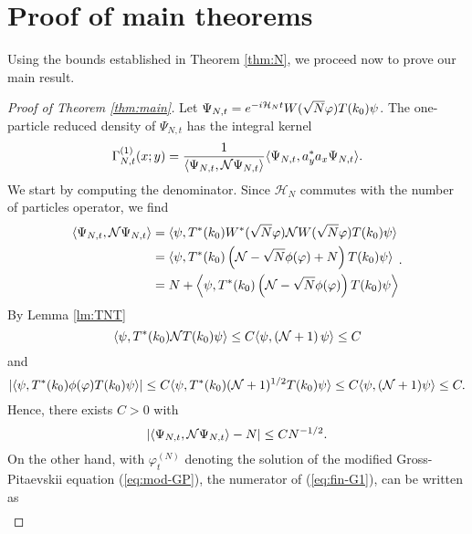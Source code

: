 \documentclass[11pt,a4paper]{article}
\newcommand{\cH}{{\cal H}}
\newcommand{\cN}{{\cal N}}
\newcommand{\Hcal}{\mathcal{H}}		%
\begin{document}
\section{Proof of main theorems}

Using the bounds established in Theorem \ref{thm:N}, we proceed now to prove our main result.

\begin{proof}[Proof of Theorem \ref{thm:main}]
Let $\Psi_{N,t} = e^{-i\cH_N t} W(\sqrt{N} \varphi) T(k_0) \psi$. The one-particle reduced density of $\Psi_{N,t}$ has the integral kernel
\begin{equation}\label{eq:fin-G1} \Gamma_{N,t}^{(1)} (x;y) = \frac{1}{\langle \Psi_{N,t} , \cN \Psi_{N,t} \rangle} \langle \Psi_{N,t} , a_y^* a_x \Psi_{N,t} \rangle. \end{equation}
We start by computing the denominator. Since $\Hcal_N$ commutes with the number of particles operator, we find
\[ \begin{split} 
\langle \Psi_{N,t} , \cN \Psi_{N,t} \rangle = \; &\langle \psi,T^* (k_0) W^* (\sqrt{N} \varphi) \cN W (\sqrt{N} \varphi)  T(k_0) \psi\rangle  \\ = \; &\langle \psi, T^* (k_0) \left( \cN - \sqrt{N} \phi (\varphi) + N \right) T(k_0) \psi \rangle \\ = \; &N + \left\langle \psi,  T^* (k_0) \left(\cN - \sqrt{N} \phi(\varphi) \right) T(k_0) \psi \right\rangle\end{split}. \]
By Lemma \ref{lm:TNT}
\[  \langle \psi , T^* (k_0) \cN T(k_0) \psi \rangle \leq C \langle \psi , (\cN+1) \, \psi \rangle \leq C \]
and 
\[ \left| \langle \psi , T^*(k_0) \phi (\varphi) T(k_0) \psi \rangle \right| \leq C \langle \psi, T^* (k_0) (\cN+1)^{1/2} T(k_0) \psi \rangle \leq C \langle \psi , (\cN+1) \psi \rangle \leq C. \]
Hence, there exists $C>0$ with
\begin{equation}\label{eq:fin-G2} \left| \langle \Psi_{N,t} , \cN \Psi_{N,t} \rangle - N \right| \leq C N^{-1/2}. \end{equation}
On the other hand, with $\varphi^{(N)}_t$ denoting the solution of the modified Gross-Pitaevskii equation (\ref{eq:mod-GP}), the numerator of (\ref{eq:fin-G1}), can be written as  
\[ \begin{split} 

\end{split}\]
\end{proof}
\end{document}
